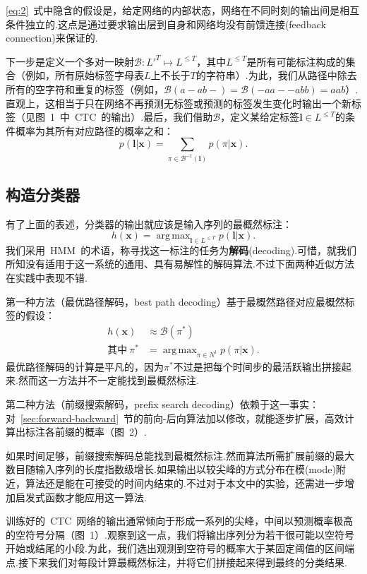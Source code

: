 \documentclass{ctexart}
\DeclareMathOperator*{\argmax}{arg\,max}
\def\cB{\mathcal{B}}
\def\vl{\mathbf{l}}
\def\vx{\mathbf{x}}
\begin{document}
\eqref{eq:2}~式中隐含的假设是，给定网络的内部状态，网络在不同时刻的输出间是相互条件独立的.这点是通过要求输出层到自身和网络均没有前馈连接(feedback connection)来保证的.

下一步是定义一个多对一映射$\cB: L'^T\mapsto L^{\le T}$，其中$L^{\le T}$是所有可能标注构成的集合（例如，所有原始标签字母表$L$上不长于$T$的字符串）.为此，我们从路径中除去所有的空字符和重复的标签（例如，$\cB(a-ab-)=\cB(-aa--abb)=aab$）.直观上，这相当于只在网络不再预测无标签或预测的标签发生变化时输出一个新标签（见图~1~中~CTC~的输出）.最后，我们借助$\cB$，定义某给定标签$\vl\in L^{\le T}$的条件概率为其所有对应路径的概率之和：
\begin{equation}
	\label{eq:3}
	p(\vl|\vx) = \sum_{\pi\in\cB^{-1}(\vl)}p(\pi|\vx).
\end{equation}
\subsection{构造分类器}
\label{sec:classifier}
有了上面的表述，分类器的输出就应该是输入序列的最概然标注：
\[h(\vx) = \argmax_{\vl\in L^{\le T}} p(\vl|\vx).\]
我们采用~HMM~的术语，称寻找这一标注的任务为\textbf{解码}(decoding).可惜，就我们所知没有适用于这一系统的通用、具有易解性的解码算法.不过下面两种近似方法在实践中表现不错.

第一种方法（最优路径解码，best path decoding）基于最概然路径对应最概然标签的假设：
\begin{equation}
	\begin{split}
		h(\vx) & \approx \cB(\pi^*)\\
		\text{其中}~\pi^* & = \argmax_{\pi\in N^t}p(\pi|\vx).
	\end{split}
\end{equation}
最优路径解码的计算是平凡的，因为$\pi^*$不过是把每个时间步的最活跃输出拼接起来.然而这一方法并不一定能找到最概然标注.

第二种方法（前缀搜索解码，prefix search decoding）依赖于这一事实：对~\ref{sec:forward-backward}~节的前向-后向算法加以修改，就能逐步扩展，高效计算出标注各前缀的概率（图~2）.

如果时间足够，前缀搜索解码总能找到最概然标注.然而算法所需扩展前缀的最大数目随输入序列的长度指数级增长.如果输出以较尖峰的方式分布在模(mode)附近，算法还是能在可接受的时间内结束的.不过对于本文中的实验，还需进一步增加启发式函数才能应用这一算法.

训练好的~CTC~网络的输出通常倾向于形成一系列的尖峰，中间以预测概率极高的空符号分隔（图~1）.观察到这一点，我们将输出序列分为若干很可能以空符号开始或结尾的小段.为此，我们选出观测到空符号的概率大于某固定阈值的区间端点.接下来我们对每段计算最概然标注，并将它们拼接起来得到最终的分类结果.
\end{document}
